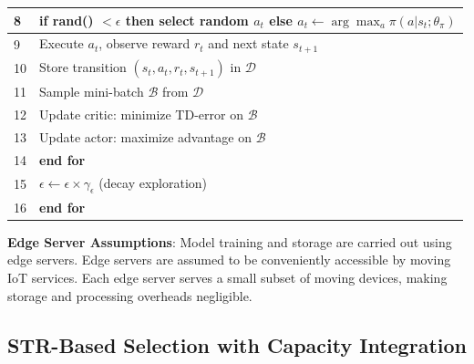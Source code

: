 \documentclass[10pt,twocolumn]{article}
\begin{document}
\begin{table}[htbp]
{\begin{tabular}{|l|p{10cm}|}
			\hline
			8             & \quad\quad \textbf{if} rand() $< \epsilon$ \textbf{then} select random $a_t$ \textbf{else} $a_t \gets \arg\max_a \pi(a|s_t;\theta_{\pi})$ \\
			\hline
			9             & \quad\quad Execute $a_t$, observe reward $r_t$ and next state $s_{t+1}$                                                                   \\
			\hline
			10            & \quad\quad Store transition $(s_t, a_t, r_t, s_{t+1})$ in $\mathcal{D}$                                                                   \\
			\hline
			11            & \quad\quad Sample mini-batch $\mathcal{B}$ from $\mathcal{D}$                                                                             \\
			\hline
			12            & \quad\quad Update critic: minimize TD-error on $\mathcal{B}$                                                                              \\
			\hline
			13            & \quad\quad Update actor: maximize advantage on $\mathcal{B}$                                                                              \\
			\hline
			14            & \quad \textbf{end for}                                                                                                                    \\
			\hline
			15            & \quad $\epsilon \gets \epsilon \times \gamma_\epsilon$ (decay exploration)                                                                \\
			\hline
			16            & \textbf{end for}                                                                                                                          \\
			\hline
		\end{tabular}}
\end{table}

\textbf{Edge Server Assumptions}: Model training and storage are carried
out using edge servers. Edge servers are assumed to be conveniently
accessible by moving IoT services. Each edge server serves a small
subset of moving devices, making storage and processing overheads
negligible.

\subsection{STR-Based Selection with Capacity Integration}\label{str-based-selection-with-capacity-integration}
\end{document}
